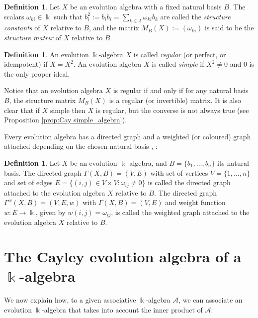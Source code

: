 \documentclass[a4paper,12pt]{amsart}
\theoremstyle{definition}
\newtheorem{definition}[theorem]{Definition}
\theoremstyle{remark}
\newcommand{\A}{\mathcal{A}}
\begin{document}
\begin{definition}\label{def:structure}
	Let $X$ be an evolution algebra with a fixed natural basis $B$. The scalars $\omega_{ki} \in\Bbbk$ such that
	$b_i^2:=b_i b_i=\sum_{k\in\Lambda}\omega_{ki}b_k$ are called the \textit{structure constants} of $X$ relative to $B$, and the matrix $M_B(X) := (\omega_{ki})$ is said to be the \textit{structure matrix} of $X$ relative to $B$.
\end{definition}


\begin{definition}\label{def:regular}
	An evolution  $\Bbbk$-algebra $X$ is called \textit{regular} (or perfect, or idempotent) if  $X=X^2$.	An evolution algebra $X$ is called \textit{simple} if $X^2\neq 0$ and $0$ is the only proper ideal.
\end{definition}

	Notice  that an evolution algebra $X$ is regular if and only if for any natural basis $B$, the structure matrix $M_B(X)$ is a regular (or invertible) matrix. It is also clear that if $X$ simple then $X$ is regular, but the converse is not always true (see Proposition \ref{prop:Cay simple_algebra}).


Every evolution algebra has a directed graph and a weighted (or coloured) graph attached depending on the chosen natural basis \cite[Definition 15]{Tian}, \cite[Definition 2.2]{Elduque-Labra-2015}:

\begin{definition}\label{def:digraph}
Let $X$ be an evolution $\Bbbk$-algebra, and $B=\{b_1,\ldots,b_n\}$ its natural basis. 
The directed graph $\Gamma(X,B)=(V,E)$ with set of vertices $V=\{1,\ldots,n\}$ and set of edges $E=\{(i,j)\in V\times V: \omega_{ij}\ne 0\}$ is called the directed graph attached to the evolution algebra $X$ relative to $B$. The directed graph $\Gamma^w(X,B)=(V,E,w)$ with $\Gamma(X,B)=(V,E)$ and weight function $w\colon E\to \Bbbk$,  given by $w(i,j)=\omega_{ij}$, is called the weighted graph attached to the evolution algebra $X$ relative to $B$.
\end{definition}


\section{The Cayley evolution algebra of a $\Bbbk$-algebra}\label{sec:general}

We now explain how, to a given associative $\Bbbk$-algebra $\A$, we can associate an evolution $\Bbbk$-algebra that takes into account the inner product of $\A$:
\end{document}
